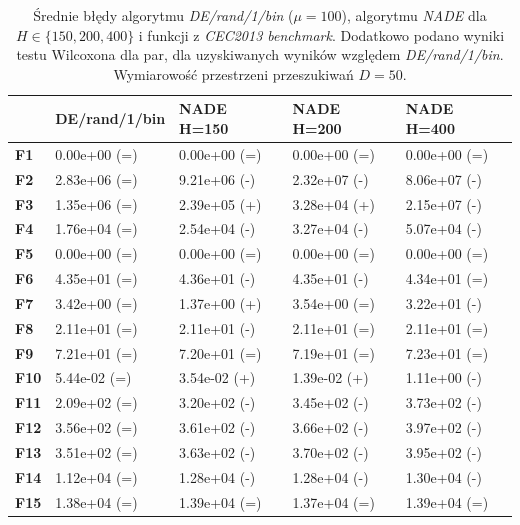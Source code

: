 \documentclass[12pt,a4paper]{report}
\begin{document}
{{{{{{\begin{table}[]
\centering
\caption{Średnie błędy algorytmu \emph{DE/rand/1/bin} ($\mu = 100$), algorytmu \emph{NADE} dla $H \in \{150, 200, 400\}$ i funkcji z \emph{CEC2013 benchmark}. Dodatkowo podano wyniki testu Wilcoxona dla par, dla uzyskiwanych wyników względem \emph{DE/rand/1/bin}. Wymiarowość przestrzeni przeszukiwań $D = 50$.}
\label{Eksp150}
\begin{tabular}{|l|l|l|l|l|}
\hline
          & {\bf DE/rand/1/bin} & {\bf NADE H=150} & {\bf NADE H=200} & {\bf NADE H=400} \\ \hline
{\bf F1}  & 0.00e+00 (=)        & 0.00e+00 (=)     & 0.00e+00 (=)     & 0.00e+00 (=)     \\ \hline
{\bf F2}  & 2.83e+06 (=)        & 9.21e+06 (-)     & 2.32e+07 (-)     & 8.06e+07 (-)     \\ \hline
{\bf F3}  & 1.35e+06 (=)        & 2.39e+05 (+)     & 3.28e+04 (+)     & 2.15e+07 (-)     \\ \hline
{\bf F4}  & 1.76e+04 (=)        & 2.54e+04 (-)     & 3.27e+04 (-)     & 5.07e+04 (-)     \\ \hline
{\bf F5}  & 0.00e+00 (=)        & 0.00e+00 (=)     & 0.00e+00 (=)     & 0.00e+00 (=)     \\ \hline
{\bf F6}  & 4.35e+01 (=)        & 4.36e+01 (-)     & 4.35e+01 (-)     & 4.34e+01 (=)     \\ \hline
{\bf F7}  & 3.42e+00 (=)        & 1.37e+00 (+)     & 3.54e+00 (=)     & 3.22e+01 (-)     \\ \hline
{\bf F8}  & 2.11e+01 (=)        & 2.11e+01 (-)     & 2.11e+01 (=)     & 2.11e+01 (=)     \\ \hline
{\bf F9}  & 7.21e+01 (=)        & 7.20e+01 (=)     & 7.19e+01 (=)     & 7.23e+01 (=)     \\ \hline
{\bf F10} & 5.44e-02 (=)        & 3.54e-02 (+)     & 1.39e-02 (+)     & 1.11e+00 (-)     \\ \hline
{\bf F11} & 2.09e+02 (=)        & 3.20e+02 (-)     & 3.45e+02 (-)     & 3.73e+02 (-)     \\ \hline
{\bf F12} & 3.56e+02 (=)        & 3.61e+02 (-)     & 3.66e+02 (-)     & 3.97e+02 (-)     \\ \hline
{\bf F13} & 3.51e+02 (=)        & 3.63e+02 (-)     & 3.70e+02 (-)     & 3.95e+02 (-)     \\ \hline
{\bf F14} & 1.12e+04 (=)        & 1.28e+04 (-)     & 1.28e+04 (-)     & 1.30e+04 (-)     \\ \hline
{\bf F15} & 1.38e+04 (=)        & 1.39e+04 (=)     & 1.37e+04 (=)     & 1.39e+04 (=)     \\ \hline

\end{tabular}
\end{table}}}}}}}
\end{document}
